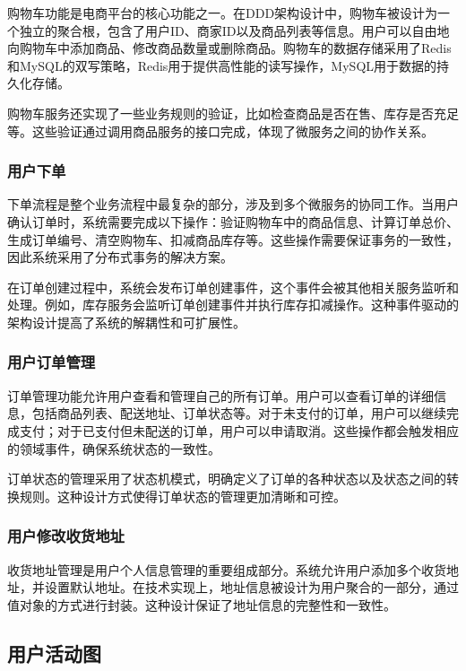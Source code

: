 \documentclass[a4paper,12pt]{article}
\begin{document}
购物车功能是电商平台的核心功能之一。在DDD架构设计中，购物车被设计为一个独立的聚合根，包含了用户ID、商家ID以及商品列表等信息。用户可以自由地向购物车中添加商品、修改商品数量或删除商品。购物车的数据存储采用了Redis和MySQL的双写策略，Redis用于提供高性能的读写操作，MySQL用于数据的持久化存储。

购物车服务还实现了一些业务规则的验证，比如检查商品是否在售、库存是否充足等。这些验证通过调用商品服务的接口完成，体现了微服务之间的协作关系。

\subsubsection{用户下单}

下单流程是整个业务流程中最复杂的部分，涉及到多个微服务的协同工作。当用户确认订单时，系统需要完成以下操作：验证购物车中的商品信息、计算订单总价、生成订单编号、清空购物车、扣减商品库存等。这些操作需要保证事务的一致性，因此系统采用了分布式事务的解决方案。

在订单创建过程中，系统会发布订单创建事件，这个事件会被其他相关服务监听和处理。例如，库存服务会监听订单创建事件并执行库存扣减操作。这种事件驱动的架构设计提高了系统的解耦性和可扩展性。

\subsubsection{用户订单管理}

订单管理功能允许用户查看和管理自己的所有订单。用户可以查看订单的详细信息，包括商品列表、配送地址、订单状态等。对于未支付的订单，用户可以继续完成支付；对于已支付但未配送的订单，用户可以申请取消。这些操作都会触发相应的领域事件，确保系统状态的一致性。

订单状态的管理采用了状态机模式，明确定义了订单的各种状态以及状态之间的转换规则。这种设计方式使得订单状态的管理更加清晰和可控。

\subsubsection{用户修改收货地址}

收货地址管理是用户个人信息管理的重要组成部分。系统允许用户添加多个收货地址，并设置默认地址。在技术实现上，地址信息被设计为用户聚合的一部分，通过值对象的方式进行封装。这种设计保证了地址信息的完整性和一致性。

\subsection{用户活动图}
\end{document}
